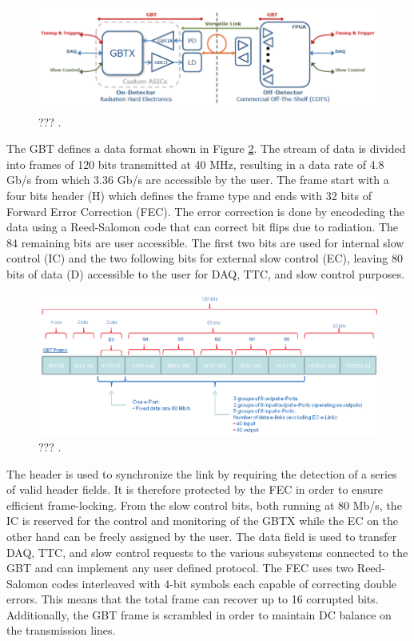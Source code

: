       \begin{figure}[h!]
        \centering
        \includegraphics[width=\textwidth]{img/II-2-daq/gbt-versatile.pdf}
        \caption{??? \cite{Moreira:1235836}.}
        \label{fig:II-2-gbt-versatile}
      \end{figure}

      The GBT defines a data format shown in Figure \ref{fig:II-2-gbt-frame}. The stream of data is divided into frames of 120 bits transmitted at 40 MHz, resulting in a data rate of 4.8 Gb/s from which 3.36 Gb/s are accessible by the user. The frame start with a four bits header (H) which defines the frame type and ends with 32 bits of Forward Error Correction (FEC). The error correction is done by encodeding the data using a Reed-Salomon code that can correct bit flips due to radiation. The 84 remaining bits are user accessible. The first two bits are used for internal slow control (IC) and the two following bits for external slow control (EC), leaving 80 bits of data (D) accessible to the user for DAQ, TTC, and slow control purposes. \\

      \begin{figure}[h!]
        \centering
        \includegraphics[width=\textwidth]{img/II-2-daq/gbt-frame.pdf}
        \caption{??? \cite{Moreira:1235836}.}
        \label{fig:II-2-gbt-frame}
      \end{figure}

      The header is used to synchronize the link by requiring the detection of a series of valid header fields. It is therefore protected by the FEC in order to ensure efficient frame-locking. From the slow control bits, both running at 80 Mb/s, the IC is reserved for the control and monitoring of the GBTX while the EC on the other hand can be freely assigned by the user. The data field is used to transfer DAQ, TTC, and slow control requests to the various subsystems connected to the GBT and can implement any user defined protocol. The FEC uses two Reed-Salomon codes interleaved with 4-bit symbols each capable of correcting double errors. This means that the total frame can recover up to 16 corrupted bits. Additionally, the GBT frame is scrambled in order to maintain DC balance on the transmission lines. \\

